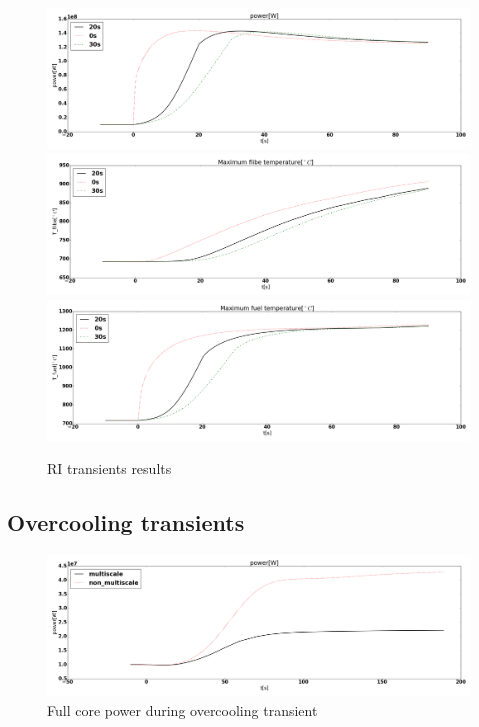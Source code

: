\documentclass{elsarticle}
\begin{document}
\begin{figure}[h]
    \centering
        \includegraphics[width=\textwidth]{./images/diffusion/tmsr/RI/diff_time/power.png}
        \includegraphics[width=\textwidth]{./images/diffusion/tmsr/RI/diff_time/T_flibe_max.png}
        \includegraphics[width=\textwidth]{./images/diffusion/tmsr/RI/diff_time/T_fuel_max.png}
    \caption{RI transients results}
    \label{fig:RI_time}
\end{figure}




\newpage
\subsection{Overcooling transients}

\begin{figure}[h]
    \centering
        \includegraphics[width=1\linewidth]{./images/diffusion/tmsr/OC/compare_multiscale/power.png}
        \caption{Full core power during overcooling transient}
        \label{fig:OC_power}
\end{figure}
\end{document}
